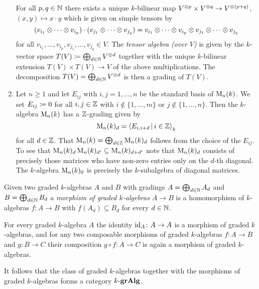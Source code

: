 \begin{example}
\begin{enumerate}
      For all $p, q \in \mathbb{N}$ there exists a unique $k$-bilinear map $V^{\mathbin{\otimes} p} \times V^{\mathbin{\otimes} q} \to V^{\mathbin{\otimes}(p+q)}$, $(x, y) \mapsto x \cdot y$ which is given on simple tensors by
      \[
          (v_{i_1} \mathbin{\otimes} \dotsb \mathbin{\otimes} v_{i_p}) \cdot (v_{j_1} \mathbin{\otimes} \dotsb \mathbin{\otimes} v_{j_q})
        = v_{i_1} \mathbin{\otimes} \dotsb \mathbin{\otimes} v_{i_p} \mathbin{\otimes} v_{j_1} \mathbin{\otimes} \dotsb \mathbin{\otimes} v_{j_q}
      \]
      for all $v_{i_1}, \dotsc, v_{i_p}, v_{j_1}, \dotsc, v_{j_q} \in V$.
      The \emph{tensor algebra \textup(over $V$\textup)} is given by the $k$-vector space $T(V) \coloneqq \bigoplus_{d \in \mathbb{N}} V^{\mathbin{\otimes} d}$ together with the unique $k$-bilinear extension $T(V) \times T(V) \to V$ of the above multiplications.
      The decomposition $T(V) = \bigoplus_{d \in \mathbb{N}} V^{\mathbin{\otimes} d}$ is then a grading of $T(V)$.
    \item
      Let $n \geq 1$ and let $E_{ij}$ with $i,j = 1, \dotsc, n$ be the standard basis of $\operatorname{M}_n(k)$.
      We set $E_{ij} \coloneqq 0$ for all $i,j \in \mathbb{Z}$ with $i \notin \{1, \dotsc, m\}$ or $j \notin \{1, \dotsc, n\}$.
      Then the $k$-algebra $\operatorname{M}_n(k)$ has a $\mathbb{Z}$-grading given by
      \[
          \Mat_n(k)_d
        = \gen{ E_{i,i+d} \suchthat i \in \Integer }_k
      \]
      for all $d \in \mathbb{Z}$.
      That $\operatorname{M}_n(k) = \bigoplus_{d \in \mathbb{Z}} \operatorname{M}_n(k)_d$ follows from the choice of the $E_{ij}$.
      To see that $\operatorname{M}_n(k)_{d} \operatorname{M}_n(k)_{d'} \subseteq \operatorname{M}_n(k)_{d + d'}$ note that $\operatorname{M}_n(k)_d$ consists of precisely those matrices who have non-zero entries only on the $d$-th diagonal.
      The $k$-algebra $\operatorname{M}_n(k)_0$ is precisely the $k$-subalgebra of diagonal matrices.
  \end{enumerate}
\end{example}


\begin{remark}
  Given two graded $k$-algebras $A$ and $B$ with gradings $A = \bigoplus_{d \in \mathbb{N}} A_d$ and $B = \bigoplus_{d \in \mathbb{N}} B_d$ a \emph{morphism of graded $k$-algebras $A \to B$} is a homomorphism of $k$-algebras $f \colon A \to B$ with $f(A_d) \subseteq B_d$ for every $d \in \mathbb{N}$.
  
  For every graded $k$-algebra $A$ the identity $\operatorname{id}_A \colon A \to A$ is a morphism of graded $k$-algebras, and for any two composable morphisms of graded $k$-algebras $f \colon A \to B$ and $g \colon B \to C$ their composition $g \circ f \colon A \to C$ is again a morphism of graded $k$-algebras.
  
  It follows that the class of graded $k$-algebras together with the morphisms of graded $k$-algebras forms a category $k\text{-}\mathbf{grAlg}$.
\end{remark}






